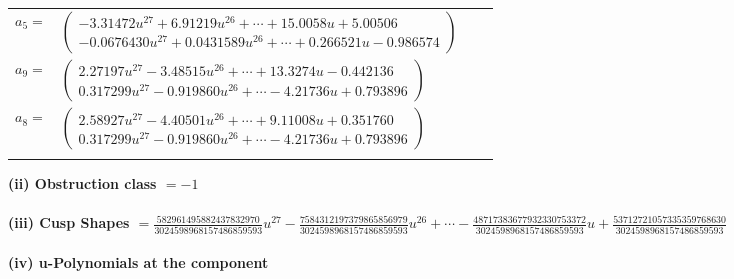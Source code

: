 \documentclass[1p]{elsarticle_modified}
\theoremstyle{definition}
\begin{document}
\begin{tabular}{m{7pt} m{180pt} m{7pt} m{180pt} }
\flushright $a_{5}=$&$\begin{pmatrix}-3.31472 u^{27}+6.91219 u^{26}+\cdots+15.0058 u+5.00506\\-0.0676430 u^{27}+0.0431589 u^{26}+\cdots+0.266521 u-0.986574\end{pmatrix}$ \\
\flushright $a_{9}=$&$\begin{pmatrix}2.27197 u^{27}-3.48515 u^{26}+\cdots+13.3274 u-0.442136\\0.317299 u^{27}-0.919860 u^{26}+\cdots-4.21736 u+0.793896\end{pmatrix}$ \\
\flushright $a_{8}=$&$\begin{pmatrix}2.58927 u^{27}-4.40501 u^{26}+\cdots+9.11008 u+0.351760\\0.317299 u^{27}-0.919860 u^{26}+\cdots-4.21736 u+0.793896\end{pmatrix}$\\&\end{tabular}
\flushleft \textbf{(ii) Obstruction class $= -1$}\\~\\
\flushleft \textbf{(iii) Cusp Shapes $= \frac{582961495882437832970}{3024598968157486859593} u^{27}-\frac{7584312197379865856979}{3024598968157486859593} u^{26}+\cdots-\frac{48717383677932330753372}{3024598968157486859593} u+\frac{53712721057335359768630}{3024598968157486859593}$}\\~\\
\newpage\renewcommand{\arraystretch}{1}
\flushleft \textbf{(iv) u-Polynomials at the component}\newline \\
\end{document}
